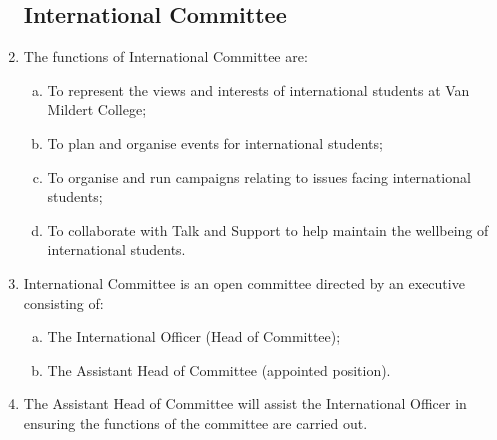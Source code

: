\documentclass[12pt]{article}
\begin{document}
\begin{enumerate}
    \subsection{International Committee}
    \item The functions of International Committee are:
    \begin{enumerate}[(a)]
        \item To represent the views and interests of international students at Van Mildert College;
        \item To plan and organise events for international students;
        \item To organise and run campaigns relating to issues facing international students;
        \item To collaborate with Talk and Support to help maintain the wellbeing of international students.
    \end{enumerate}
    \item International Committee is an open committee directed by an executive consisting of:
    \begin{enumerate}[(a)]
        \item The International Officer (Head of Committee);
        \item The Assistant Head of Committee (appointed position).
    \end{enumerate}
    \item The Assistant Head of Committee will assist the International Officer in ensuring the functions of the committee are carried out.
\end{enumerate}
\end{document}
